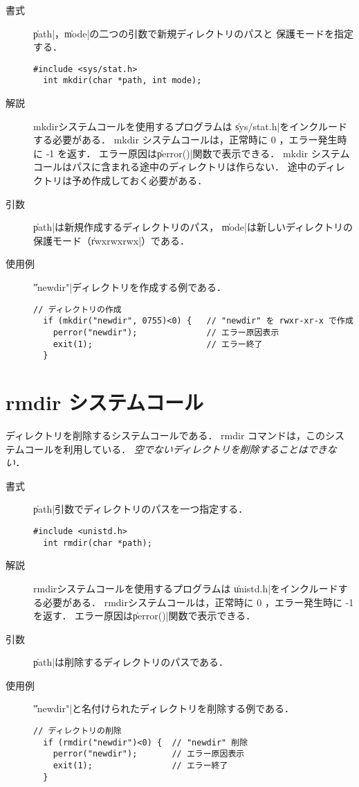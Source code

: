 \begin{description}
\item[書式] \|path|，\|mode|の二つの引数で新規ディレクトリのパスと
保護モードを指定する．
\begin{lstlisting}[numbers=none]
  #include <sys/stat.h>
  int mkdir(char *path, int mode);
\end{lstlisting}

\item[解説] mkdirシステムコールを使用するプログラムは
\|sys/stat.h|をインクルードする必要がある．
mkdir システムコールは，正常時に 0 ，エラー発生時に -1 を返す．
エラー原因は\|perror()|関数で表示できる．
mkdir システムコールはパスに含まれる途中のディレクトリは作らない．
途中のディレクトリは予め作成しておく必要がある．

\item[引数] \|path|は新規作成するディレクトリのパス，
\|mode|は新しいディレクトリの保護モード（\|rwxrwxrwx|）である．

\item[使用例] \|"newdir"|ディレクトリを作成する例である．
\begin{lstlisting}[numbers=none]
  // ディレクトリの作成
  if (mkdir("newdir", 0755)<0) {   // "newdir" を rwxr-xr-x で作成
    perror("newdir");              // エラー原因表示
    exit(1);                       // エラー終了
  }
\end{lstlisting}
\end{description}

\section{rmdir システムコール}
ディレクトリを削除するシステムコールである．
rmdir コマンドは，このシステムコールを利用している．
\emph{空でないディレクトリを削除することはできない．}

\begin{description}
\item[書式] \|path|引数でディレクトリのパスを一つ指定する．
\begin{lstlisting}[numbers=none]
  #include <unistd.h>
  int rmdir(char *path);
\end{lstlisting}

\item[解説] rmdirシステムコールを使用するプログラムは
\|unistd.h|をインクルードする必要がある．
rmdirシステムコールは，正常時に 0 ，エラー発生時に -1 を返す．
エラー原因は\|perror()|関数で表示できる．

\item[引数] \|path|は削除するディレクトリのパスである．

\item[使用例] \|"newdir"|と名付けられたディレクトリを削除する例である．
\begin{lstlisting}[numbers=none]
  // ディレクトリの削除
  if (rmdir("newdir")<0) {  // "newdir" 削除
    perror("newdir");       // エラー原因表示
    exit(1);                // エラー終了
  }
\end{lstlisting}
\end{description}

